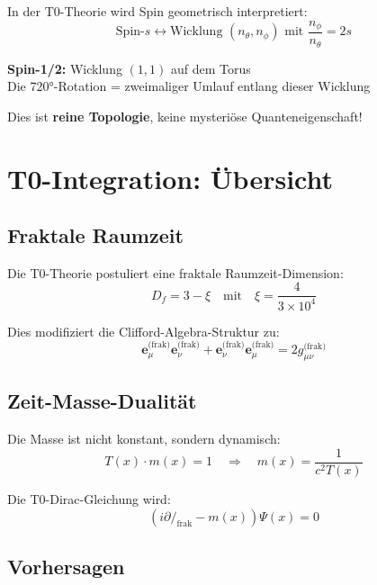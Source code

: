 	In der T0-Theorie wird Spin geometrisch interpretiert:
	\begin{equation}
		\text{Spin-}s \longleftrightarrow \text{Wicklung } (n_\theta, n_\phi) 
		\text{ mit } \frac{n_\phi}{n_\theta} = 2s
	\end{equation}
	
	\textbf{Spin-1/2:} Wicklung $(1, 1)$ auf dem Torus \\
	Die 720°-Rotation = zweimaliger Umlauf entlang dieser Wicklung
	
	Dies ist \textbf{reine Topologie}, keine mysteriöse Quanteneigenschaft!
	
	\section{T0-Integration: Übersicht}
	
	\subsection{Fraktale Raumzeit}
	
	Die T0-Theorie postuliert eine fraktale Raumzeit-Dimension:
	\begin{equation}
		D_f = 3 - \xi \quad \text{mit} \quad \xi = \frac{4}{3 \times 10^4}
	\end{equation}
	
	Dies modifiziert die Clifford-Algebra-Struktur zu:
	\begin{equation}
		\mathbf{e}_\mu^{\text{(frak)}} \mathbf{e}_\nu^{\text{(frak)}} + 
		\mathbf{e}_\nu^{\text{(frak)}} \mathbf{e}_\mu^{\text{(frak)}} = 
		2 g_{\mu\nu}^{\text{(frak)}}
	\end{equation}
	
	\subsection{Zeit-Masse-Dualität}
	
	Die Masse ist nicht konstant, sondern dynamisch:
	\begin{equation}
		T(x) \cdot m(x) = 1 \quad \Rightarrow \quad m(x) = \frac{1}{c^2 T(x)}
	\end{equation}
	
	Die T0-Dirac-Gleichung wird:
	\begin{equation}
		(i \partial\!\!\!/_{\text{frak}} - m(x))\Psi(x) = 0
	\end{equation}
	
	\subsection{Vorhersagen}
	
